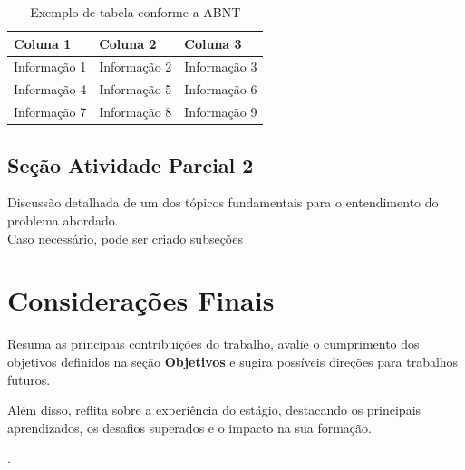 \begin{table}[ht]
    \centering
    \caption{Exemplo de tabela conforme a ABNT}
    \label{quad:exemplo}
    \begin{tabular}{p{3cm} p{4cm} p{3cm}}
        \hline%
        \textbf{Coluna 1} & \textbf{Coluna 2} & \textbf{Coluna 3} \\
        \hline%
        Informação 1 & Informação 2 & Informação 3 \\
        Informação 4 & Informação 5 & Informação 6 \\
        Informação 7 & Informação 8 & Informação 9 \\
        \hline%
    \end{tabular}
\end{table}



\subsection{ Seção Atividade Parcial 2} \label{sec:definir-tituto-da-secao2}

Discussão detalhada de um dos tópicos fundamentais para o entendimento do problema abordado. \\ Caso necessário, pode ser criado subseções


\section{Considerações Finais} \label{ch:consideracoes-finais}
Resuma as principais contribuições do trabalho, avalie o cumprimento dos objetivos definidos na seção \textbf{Objetivos} e sugira possíveis direções para trabalhos futuros.

Além disso, reflita sobre a experiência do estágio, destacando os principais aprendizados, os desafios superados e o impacto na sua formação. 


.